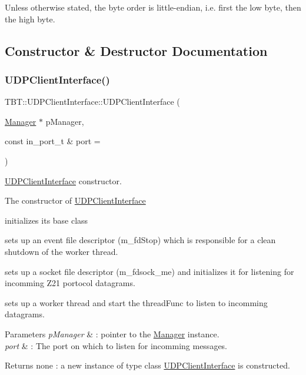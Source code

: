 Unless otherwise stated, the byte order is little-\/endian, i.\+e. first the low byte, then the high byte. 

\subsection{Constructor \& Destructor Documentation}
\mbox{\label{classTBT_1_1UDPClientInterface_ad03356f6abf16596c181851e9fcaf7a9_ad03356f6abf16596c181851e9fcaf7a9}} 
\subsubsection{\texorpdfstring{U\+D\+P\+Client\+Interface()}{UDPClientInterface()}}
{\footnotesize\ttfamily T\+B\+T\+::\+U\+D\+P\+Client\+Interface\+::\+U\+D\+P\+Client\+Interface (\begin{DoxyParamCaption}\item[{\hyperlink{classTBT_1_1Manager}{Manager} $\ast$}]{p\+Manager,  }\item[{const in\+\_\+port\+\_\+t \&}]{port = {} }\end{DoxyParamCaption})}



\hyperlink{classTBT_1_1UDPClientInterface}{U\+D\+P\+Client\+Interface} constructor. 

The constructor of \hyperlink{classTBT_1_1UDPClientInterface}{U\+D\+P\+Client\+Interface}
\begin{DoxyItemize}
\item initializes its base class
\item sets up an event file descriptor (m\+\_\+fd\+Stop) which is responsible for a clean shutdown of the worker thread.
\item sets up a socket file descriptor (m\+\_\+fdsock\+\_\+me) and initializes it for listening for incomming Z21 portocol datagrams.
\item sets up a worker thread and start the thread\+Func to listen to incomming datagrams.
\end{DoxyItemize}


\begin{DoxyParams}{Parameters}
{\em p\+Manager} & \+: pointer to the \hyperlink{classTBT_1_1Manager}{Manager} instance. \\
\hline
{\em port} & \+: The port on which to listen for incomming messages.\\
\hline
\end{DoxyParams}
\begin{DoxyReturn}{Returns}
none \+: a new instance of type class \hyperlink{classTBT_1_1UDPClientInterface}{U\+D\+P\+Client\+Interface} is constructed. 
\end{DoxyReturn}


